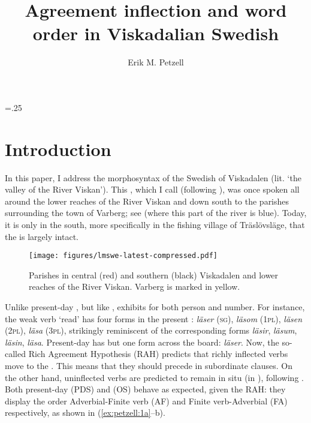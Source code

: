 \documentclass[output=paper,colorlinks,citecolor=brown,draft,draftmode]{langscibook}
\author{Erik M. Petzell\affiliation{Institute for Language and Folklore, Gothenburg}}
\title{Agreement inflection and word order in Viskadalian Swedish}
\begin{document}
\multicolsep=.25\baselineskip
\maketitle

\section{Introduction}\label{sec:petzell:1}
In this paper, I address the morphosyntax of the Swedish  of Viskadalen (lit. ‘the valley of the River Viskan’). This , which I call  (following \citealt{Petzell2017}), was once spoken all around the lower reaches of the River Viskan and down south to the parishes surrounding the town of Varberg; see  (where this part of the river is blue). Today, it is only in the south, more specifically in the fishing village of Träslövsläge, that the  is largely intact. 

\begin{figure}
\texttt{[image: figures/lmswe-latest-compressed.pdf]}
\caption{\label{figmap:petzell:1}\label{figmap:petzell:2}Parishes in central (red) and southern (black) Viskadalen and lower reaches of the River Viskan. Varberg is marked in yellow.}
\end{figure}


Unlike present-day , but like ,  exhibits  for both person and number. For instance, the weak verb ‘read’ has four forms in the present : \textit{läser} (\textsc{sg}), \textit{läsom} (1\textsc{pl}), \textit{läsen} (2\textsc{pl}), \textit{läsa} (3\textsc{pl}), strikingly reminiscent of the corresponding  forms \textit{läsir}, \textit{läsum}, \textit{läsin}, \textit{läsa}. Present-day  has but one form across the board: \textit{läser}. Now, the so-called Rich Agreement Hypothesis (RAH) predicts that richly inflected verbs move to the . This means that they should precede  in subordinate clauses. On the other hand, uninflected verbs are predicted to remain {in situ} (in ), following . Both present-day  (PDS) and  (OS) behave as expected, given the RAH: they display the order Adverbial-Finite verb (AF) and Finite verb-Adverbial (FA) respectively, as shown in (\ref{ex:petzell:1a}–b).
\end{document}

